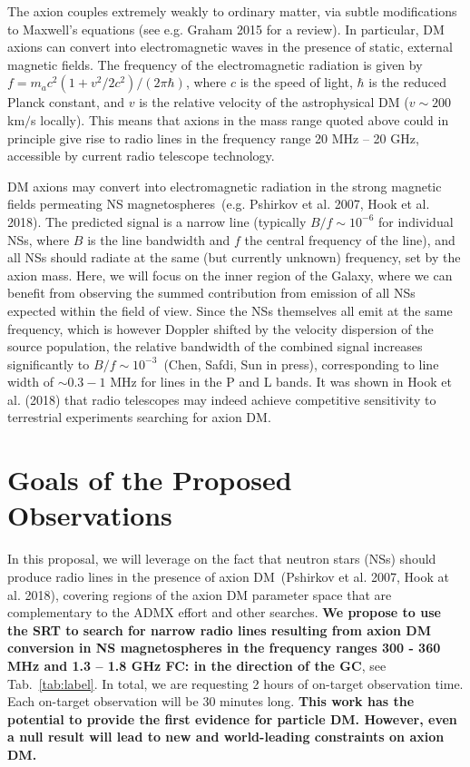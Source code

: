 \documentclass[a4paper, 11pt]{article}
\newcommand{\FC}[1]{\textbf{\color{purple} FC: #1}}
\begin{document}
The axion couples extremely weakly to ordinary matter, via  subtle modifications to Maxwell's equations (see e.g. Graham 2015 for a review).  In particular, DM axions can convert into electromagnetic waves in the presence of static, external magnetic fields.  The frequency of the electromagnetic radiation is given by $f = m_a c^2 (1 + v^2 / 2 c^2) / (2 \pi \hbar)$, where $c$ is the speed of light, $\hbar$ is the reduced Planck constant, and $v$ is the relative velocity of the astrophysical DM ($v \sim 200$ km$/$s locally).  This means that axions in the mass range quoted above could in principle give rise to radio lines in the frequency range 20 MHz -- 20 GHz, accessible by current radio telescope technology.

DM axions may convert into electromagnetic radiation in the strong magnetic fields permeating NS magnetospheres~(e.g. Pshirkov et al. 2007, Hook et al. 2018).  The predicted signal is a narrow line (typically $B / f \sim 10^{-6}$ for individual NSs, where $B$ is the line bandwidth and $f$ the central frequency of the line), and all NSs should radiate at the same (but currently unknown) frequency, set by the axion mass.   Here, we will focus on the inner region of the Galaxy, where we can benefit from observing the summed contribution from emission of all NSs expected within the field of view.  Since the NSs themselves all emit at the same frequency, which is however Doppler shifted by the velocity dispersion of the source population, the relative bandwidth of the combined signal increases significantly to $B /f \sim 10^{-3}$~(Chen, Safdi, Sun in press), corresponding to line width of $\sim 0.3-1$ MHz for lines in the P and L bands. It was shown in Hook et al. (2018) that radio telescopes may indeed achieve competitive sensitivity to terrestrial experiments searching for axion DM.


\section*{Goals of the Proposed Observations}

In this proposal, we will leverage on the fact that neutron stars (NSs) should produce radio lines in the presence of axion DM~(Pshirkov et al. 2007, Hook at al. 2018), covering regions of the axion DM parameter space that are complementary to the ADMX effort and other searches.   \textbf{We propose to use the SRT to search for narrow radio lines resulting from axion DM conversion in NS magnetospheres in the frequency ranges 300 - 360 MHz and 1.3 -- 1.8 GHz \FC{in the direction of the GC}}, see Tab.~\ref{tab:label}.  In total, we are requesting 2 hours of on-target observation time.  Each on-target observation will be 30 minutes long.   \textbf{This work has the potential to provide the first evidence for particle DM.  However, even a null result will lead to new and world-leading constraints on axion DM.} 
\end{document}
